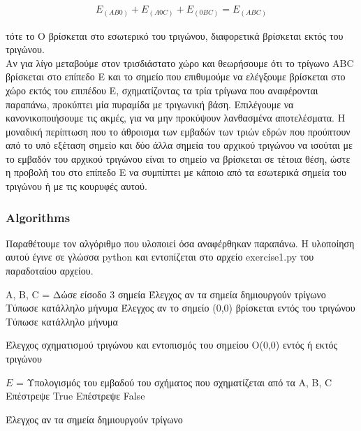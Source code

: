 \documentclass[12pt]{article}
\begin{document}
\begin{align*}
E_{(AB0)} + E_{(A0C)} + E_{(0BC)} = E_{(ABC)}
\end{align*}

τότε το O βρίσκεται στο εσωτερικό του τριγώνου, διαφορετικά βρίσκεται εκτός του τριγώνου. \\

Αν για λίγο μεταβούμε στον τρισδιάστατο χώρο και θεωρήσουμε ότι το τρίγωνο ABC βρίσκεται στο επίπεδο E και το σημείο που επιθυμούμε να ελέγξουμε βρίσκεται στο χώρο εκτός του επιπέδου Ε, σχηματίζοντας τα τρία τρίγωνα που αναφέρονται παραπάνω, προκύπτει μία πυραμίδα με τριγωνική βάση. Επιλέγουμε να κανονικοποιήσουμε τις ακμές, για να μην προκύψουν λανθασμένα αποτελέσματα. Η μοναδική περίπτωση που το άθροισμα των εμβαδών των τριών εδρών που προύπτουν από το υπό εξέταση σημείο και δύο άλλα σημεία του αρχικού τριγώνου να ισούται με το εμβαδόν του αρχικού τριγώνου είναι το σημείο να βρίσκεται σε τέτοια θέση, ώστε η προβολή του στο επίπεδο E να συμπίπτει με κάποιο από τα εσωτερικά σημεία του τριγώνου ή με τις κουρυφές αυτού. \\

\subsubsection*{Algorithms}

Παραθέτουμε τον αλγόριθμο που υλοποιεί όσα αναφέρθηκαν παραπάνω. Η υλοποίηση αυτού έγινε σε γλώσσα python και εντοπίζεται στο αρχείο exercise1.py του παραδοταίου αρχείου.

\begin{algorithm}[H]
	\SetAlgoLined

	A, B, C = Δώσε είσοδο 3 σημεία \;
	Έλεγχος αν τα σημεία δημιουργούν τρίγωνο \;
	{Τύπωσε κατάλληλο μήνυμα \;
	Έλεγχος αν το σημείο (0,0) βρίσκεται εντός του τριγώνου \;}
	{Τύπωσε κατάλληλο μήνυμα \;}

	\caption{Έλεγχος σχηματισμού τριγώνου και εντοπισμός του σημείου O(0,0) εντός ή εκτός τριγώνου}
\end{algorithm}

\begin{algorithm}[H]
	\SetAlgoLined

	\(Ε\) = Υπολογισμός του εμβαδού του σχήματος που σχηματίζεται από τα A, B, C \;
	{Επέστρεψε True \;}
	{Επέστρεψε False \;}

	\caption{Έλεγχος αν τα σημεία δημιουργούν τρίγωνο}
\end{algorithm}
\end{document}
